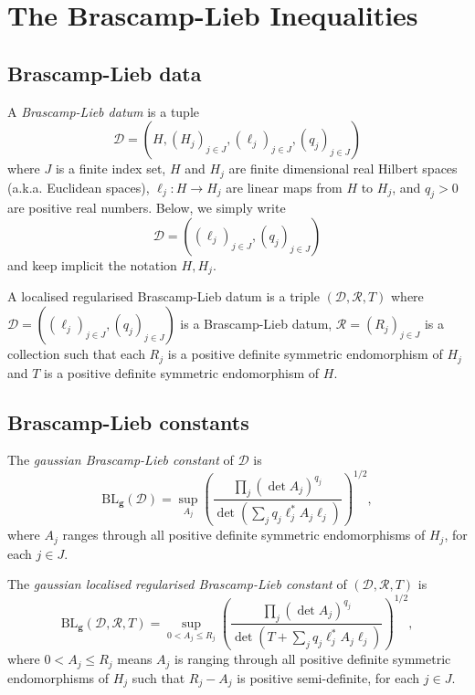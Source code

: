 \chapter{The Brascamp-Lieb Inequalities}

\section{Brascamp-Lieb data}

A \emph{Brascamp-Lieb datum} is a tuple
$$\mathcal{D}=(H, (H_{j})_{j\in J}, (\ell_j)_{j \in J}, (q_{j})_{j \in J}) $$
where $J$ is a finite index set, $H$ and $H_{j}$ are finite dimensional real Hilbert spaces (a.k.a. Euclidean spaces), $\ell_{j} : H \to H_{j}$ are
linear maps from $H$ to $H_{j}$, and $q_{j}>0$ are positive real numbers. Below, we simply write
$$\mathcal{D}=((\ell_j)_{j \in J}, (q_{j})_{j \in J})$$
and keep implicit the notation $H,H_{j}$.

A localised regularised Brascamp-Lieb datum is a triple $(\mathcal{D}, \mathcal{R}, T)$ where
$\mathcal{D} = ((\ell_j)_{j \in J}, (q_j)_{j \in J})$ is a Brascamp-Lieb datum,
$\mathcal{R} = (R_{j})_{j \in J}$ is a collection such that each $R_j$ is a positive definite symmetric endomorphism of $H_j$
and $T$ is a positive definite symmetric endomorphism of $H$.


\section{Brascamp-Lieb constants}

The \emph{gaussian Brascamp-Lieb constant} of $\mathcal{D}$ is
\begin{equation*}
\mathrm{BL}_{\mathbf{g}}(\mathcal{D}) = \sup_{A_{j}} \left(\frac{ \prod_{j}(\det A_{j})^{q_{j}}}{\det(\sum_{j} q_{j} \ell_{j}^*A_{j}\ell_{j} )}\right)^{1/2},
\end{equation*}
where $A_j$ ranges through all positive definite symmetric endomorphisms of $H_j$, for each $j \in J$.


The \emph{gaussian localised regularised Brascamp-Lieb constant} of $(\mathcal{D}, \mathcal{R}, T)$ is
\begin{equation*}
\mathrm{BL}_{\mathbf{g}}(\mathcal{D}, \mathcal{R}, T)
= \sup_{0<A_{j}\leq R_{j}} \left(\frac{ \prod_{j}(\det A_{j})^{q_{j}}}{\det(T+\sum_{j} q_{j} \ell_{j}^*A_{j}\ell_{j} )}\right)^{1/2},
\end{equation*}
where $0 < A_j \leq R_j$ means $A_j$ is ranging through all positive definite symmetric endomorphisms of $H_j$ such that $R_j - A_j$ is positive semi-definite, for each $j \in J$.


